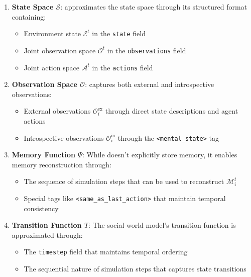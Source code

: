 \begin{enumerate}
    \item \textbf{State Space $\mathcal{S}$}: \protocolname approximates the state space through its structured format containing:
    \begin{itemize}
        \item Environment state $\mathcal{E}^t$ in the \texttt{state} field
        \item Joint observation space $\mathcal{O}^t$ in the \texttt{observations} field
        \item Joint action space $\mathcal{A}^t$ in the \texttt{actions} field
    \end{itemize}
    
    \item \textbf{Observation Space $\mathcal{O}$}: \protocolname captures both external and introspective observations:
    \begin{itemize}
        \item External observations $\mathcal{O}^{\text{ex}}_i$ through direct state descriptions and agent actions
        \item Introspective observations $\mathcal{O}^{\text{in}}_i$ through the \texttt{<mental\_state>} tag
    \end{itemize}
    
    \item \textbf{Memory Function $\Psi$}: While \protocolname doesn't explicitly store memory, it enables memory reconstruction through:
    \begin{itemize}
        \item The sequence of simulation steps that can be used to reconstruct $\mathcal{M}_i^t$
        \item Special tags like \texttt{<same\_as\_last\_action>} that maintain temporal consistency
    \end{itemize}
    
    \item \textbf{Transition Function $T$}: The social world model's transition function is approximated through:
    \begin{itemize}
        \item The \texttt{timestep} field that maintains temporal ordering
        \item The sequential nature of simulation steps that captures state transitions
    \end{itemize}
\end{enumerate}

